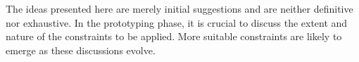 The ideas presented here are merely initial suggestions and are neither definitive nor exhaustive. In the prototyping phase, it is crucial to discuss the extent and nature of the constraints to be applied. More suitable constraints are likely to emerge as these discussions evolve.






